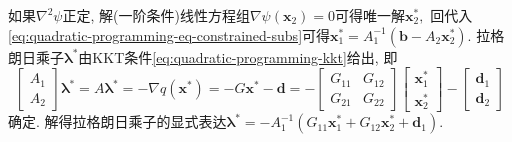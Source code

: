 \documentclass{SBCbookchapter}
\newcommand{\V}[1]{{\bm{#1}}}
\numberwithin{equation}{section}
\begin{document}
如果$\nabla^2 \psi$正定, 解(一阶条件)线性方程组$\nabla \psi (\V{x}_2) = 0$可得唯一解$\V{x}_2^*,$ 回代入\eqref{eq:quadratic-programming-eq-constrained-subs}可得$\V{x}_1^* = A_1^{-1} ( \V{b} - A_2 \V{x}_2^* ).$ 拉格朗日乘子$\V{\lambda}^*$由KKT条件\eqref{eq:quadratic-programming-kkt}给出, 即
\begin{equation}
\label{eq:quadratic-programming-eq-lambda}
\begin{bmatrix} A_1 \\ A_2 \end{bmatrix} \V{\lambda}^* = A \V{\lambda}^* = -\nabla q(\V{x}^*) = - G \V{x}^* - \V{d} = - \begin{bmatrix} G_{11} & G_{12} \\ G_{21} & G_{22} \end{bmatrix} \begin{bmatrix} \V{x}_1^* \\ \V{x}_2^* \end{bmatrix} - \begin{bmatrix} \V{d}_1 \\ \V{d}_2 \end{bmatrix}
\end{equation}
确定. 解得拉格朗日乘子的显式表达$\V{\lambda}^* = -A_1^{-1} \left( G_{11} \V{x}_1^* + G_{12} \V{x}_2^* + \V{d}_1 \right).$
\end{document}
